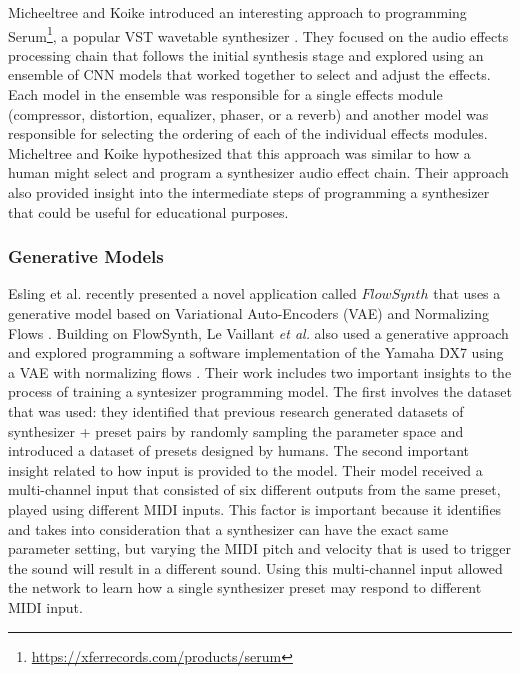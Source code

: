 Micheeltree and Koike introduced an interesting approach to programming Serum\footnote{\url{https://xferrecords.com/products/serum}}, a popular VST wavetable synthesizer \cite{mitcheltree2021serumrnn}. They focused on the audio effects processing chain that follows the initial synthesis stage and explored using an ensemble of CNN models that worked together to select and adjust the effects. Each model in the ensemble was responsible for a single effects module (compressor, distortion, equalizer, phaser, or a reverb) and another model was responsible for selecting the ordering of each of the individual effects modules. Micheltree and Koike hypothesized that this approach was similar to how a human might select and program a synthesizer audio effect chain. Their approach also provided insight into the intermediate steps of programming a synthesizer that could be useful for educational purposes.

\subsubsection{Generative Models}
Esling et al. recently presented a novel application called $FlowSynth$ that uses a generative model based on Variational Auto-Encoders (VAE) and Normalizing Flows \cite{esling2020flow}. Building on FlowSynth, Le Vaillant \textit{et al.} also used a generative approach and explored programming a software implementation of the Yamaha DX7 using a VAE with normalizing flows \cite{le2021improving}. Their work includes two important insights to the process of training a syntesizer programming model. The first involves the dataset that was used: they identified that previous research generated datasets of synthesizer + preset pairs by randomly sampling the parameter space and introduced a dataset of presets designed by humans. The second important insight related to how input is provided to the model. Their model received a multi-channel input that consisted of six different outputs from the same preset, played using different MIDI inputs. This factor is important because it identifies and takes into consideration that a synthesizer can have the exact same parameter setting, but varying the MIDI pitch and velocity that is used to trigger the sound will result in a different sound. Using this multi-channel input allowed the network to learn how a single synthesizer preset may respond to different MIDI input.

